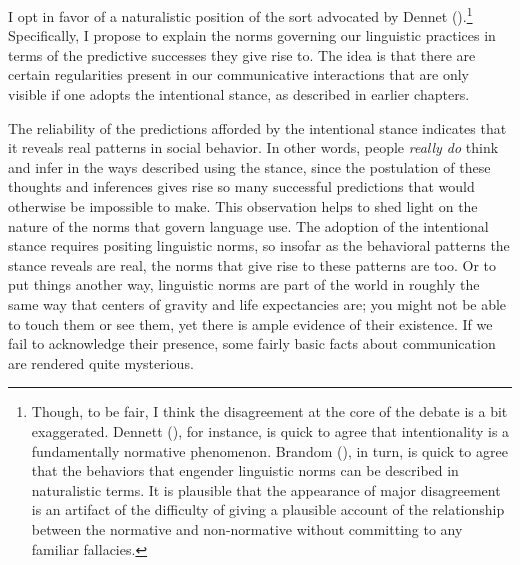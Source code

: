 I opt in favor of a naturalistic position of the sort advocated by Dennet (\citeyear{Dennett:2010,Dennett:1991,Dennett:1987}).\footnote{Though, to be fair, I think the disagreement at the core of the debate is a bit exaggerated. Dennett (\citeyear{Dennett:2010,Dennett:1987}), for instance, is quick to agree that intentionality is a fundamentally normative phenomenon. Brandom (\citeyear{Brandom:1994,Brandom:2010b}), in turn, is quick to agree that the behaviors that engender linguistic norms can be described in naturalistic terms. It is plausible that the appearance of major disagreement is an artifact of the difficulty of giving a plausible account of the relationship between the normative and non-normative without committing to any familiar fallacies.} Specifically, I propose to explain the norms governing our linguistic practices in terms of the predictive successes they give rise to. The idea is that there are certain regularities present in our communicative interactions that are only visible if one adopts the intentional stance, as described in earlier chapters. 

The reliability of the predictions afforded by the intentional stance indicates that it reveals real patterns in social behavior. In other words, people \textit{really do} think and infer in the ways described using the stance, since the postulation of these thoughts and inferences gives rise so many successful predictions that would otherwise be impossible to make. This observation helps to shed light on the nature of the norms that govern language use. The adoption of the intentional stance requires positing linguistic norms, so insofar as the behavioral patterns the stance reveals are real, the norms that give rise to these patterns are too. Or to put things another way, linguistic norms are part of the world in roughly the same way that centers of gravity and life expectancies are; you might not be able to touch them or see them, yet there is ample evidence of their existence. If we fail to acknowledge their presence, some fairly basic facts about communication are rendered quite mysterious.


